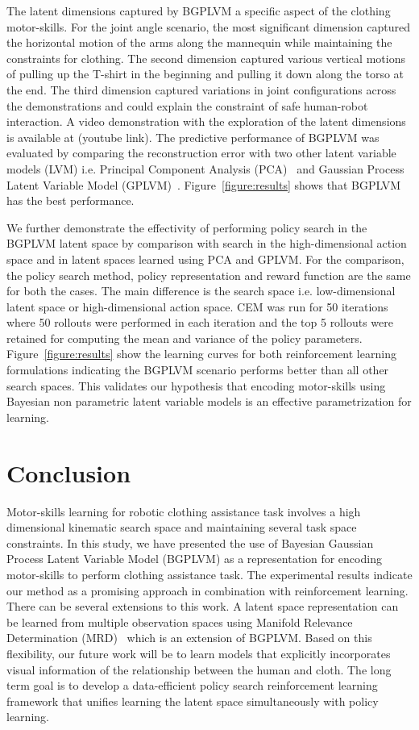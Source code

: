 \documentclass{article}
\begin{document}
The latent dimensions captured by BGPLVM a specific aspect of the clothing motor-skills. For the joint angle scenario, the most significant dimension captured the horizontal motion of the arms along the mannequin while maintaining the constraints for clothing. The second dimension captured various vertical motions of pulling up the T-shirt in the beginning and pulling it down along the torso at the end. The third dimension captured variations in joint configurations across the demonstrations and could explain the constraint of safe human-robot interaction. A video demonstration with the exploration of the latent dimensions is available at (youtube link). The predictive performance of BGPLVM was evaluated by comparing the reconstruction error with two other latent variable models (LVM) i.e. Principal Component Analysis (PCA)~\cite{pca} and Gaussian Process Latent Variable Model (GPLVM)~\cite{gplvm}. Figure~\ref{figure:results} shows that BGPLVM has the best performance.

We further demonstrate the effectivity of performing policy search in the BGPLVM latent space by comparison with search in the high-dimensional action space and in latent spaces learned using PCA and GPLVM. For the comparison, the policy search method, policy representation and reward function are the same for both the cases. The main difference is the search space i.e. low-dimensional latent space or high-dimensional action space. CEM was run for 50 iterations where 50 rollouts were performed in each iteration and the top 5 rollouts were retained for computing the mean and variance of the policy parameters. Figure~\ref{figure:results} show the learning curves for both reinforcement learning formulations indicating the BGPLVM scenario performs better than all other search spaces. This validates our hypothesis that encoding motor-skills using Bayesian non parametric latent variable models is an effective parametrization for learning.

\section{Conclusion}
\label{section:conclusion}

Motor-skills learning for robotic clothing assistance task involves a high dimensional kinematic search space and maintaining several task space constraints. In this study, we have presented the use of Bayesian Gaussian Process Latent Variable Model (BGPLVM) as a representation for encoding motor-skills to perform clothing assistance task. The experimental results indicate our method as a promising approach in combination with reinforcement learning. There can be several extensions to this work. A latent space representation can be learned from multiple observation spaces using Manifold Relevance Determination (MRD)~\cite{mrd} which is an extension of BGPLVM. Based on this flexibility, our future work will be to learn models that explicitly incorporates visual information of the relationship between the human and cloth. The long term goal is to develop a data-efficient policy search reinforcement learning framework that unifies learning the latent space simultaneously with policy learning.
\end{document}
